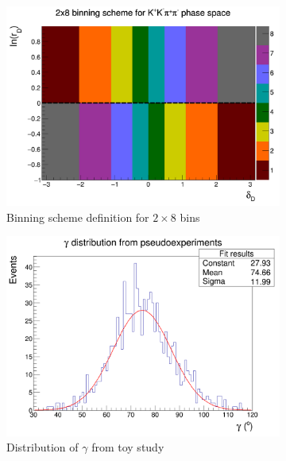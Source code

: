 \documentclass[12pt, a4paper, notitlepage, onecolumn]{article}
\begin{document}
\begin{figure}[H] 
  \centering
  \begin{subfigure}{0.5\textwidth}
    \centering
    \includegraphics[width=1\textwidth]{Plots/BinningSchemePlot.png}
    \caption{Binning scheme definition for $2\times 8$ bins}
    \label{fig_binning_scheme}
  \end{subfigure}%
  \begin{subfigure}{0.5\textwidth}
    \centering
    \includegraphics[width=1\textwidth]{Plots/GammaDistribution8BinsVariableWidth.png}
    \caption{Distribution of $\gamma$ from toy study}
    \label{fig_gamma_pull_study}
  \end{subfigure}
  \caption{}
\end{figure}
\end{document}
